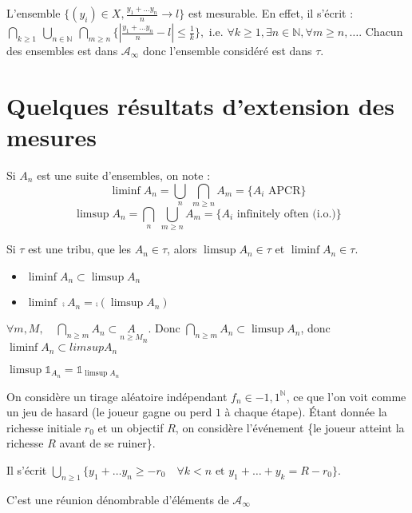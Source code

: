 \documentclass[10pt,a4paper,notitlepage ]{report}
\begin{document}
\begin{exemple}
	L'ensemble $\{(y_i)\in X, \frac{y_1 + \dots y_n}{n} \rightarrow l\}$ est mesurable. En effet, il s'écrit : $\underset{k\ge 1}{\bigcap}\ \underset{n\in \mathbb N}{\bigcup}\ \underset{m \ge n}{\bigcap} \{\left| \frac{y_1+ \dots y_n}{n} - l \right| \le \frac{1}{k}\}, \text{ i.e. } \forall k \ge 1, \exists n\in \mathbb N, \forall m\ge n, \dots$. 
	Chacun des ensembles est dans $\mathcal A_\infty$ donc l'ensemble considéré est dans $\tau$.
\end{exemple}

\section{Quelques résultats d'extension des mesures}
	Si $A_n$ est une suite d'ensembles, on note :
	\[ \liminf A_n = \underset{n}{\bigcup}\ \underset{m\ge n}{\bigcap} A_m = \{A_i \text{ APCR}\}\]
	\[ \limsup A_n = \underset{n}{\bigcap}\ \underset{m\ge n}{\bigcup} A_m = \{A_i \text{ infinitely often (i.o.)}\}\]
	
	Si $\tau$ est une tribu, que les $A_n \in \tau$, alors $\limsup A_n \in \tau$ et $\liminf A_n \in \tau$.
	
	\begin{propriete}
		\begin{itemize}
			\item $\liminf A_n \subset \limsup A_n$
			\item $\liminf \comp{A_n}= \comp{(\limsup A_n)}$
		\end{itemize}
	\end{propriete}
	\begin{demo}
		$\forall m,M, \quad \underset{n\ge m}{\bigcap} A_n \subset \underset{n \ge M} A_n$.
		Donc $\underset{n\ge m}{\bigcap} A_n \subset \limsup A_n$, donc $\liminf A_n \subset limsup A_n$
	\end{demo}
\begin{exo}
	$\limsup \mathds 1_{A_n} = \mathds 1_{\limsup A_n}$
\end{exo}

\begin{exemple}
	On considère un tirage aléatoire indépendant $f_n \in {-1, 1}^{\mathbb N}$, ce que l'on voit comme un jeu de hasard (le joueur gagne ou perd $1$ à chaque étape). Étant donnée la richesse initiale $r_0$ et un objectif $R$, on considère l'événement \{le joueur atteint la richesse $R$ avant de se ruiner\}.
	
	Il s'écrit $\underset{n \ge 1}{\bigcup} \{y_1 + \dots y_n \ge -r_0 \quad \forall k < n \text{ et } y_1 + \dots + y_k = R-r_0\}$.
	
	C'est une réunion dénombrable d'éléments de $\mathcal A_\infty$
\end{exemple}
\end{document}
